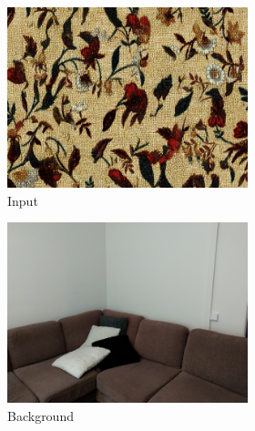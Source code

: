 \begin{figure}[]
    \begin{subfigure}{\textwidth}
        \centering
        \begin{subfigure}{0.24\textwidth}
            \centering
            \includegraphics[width=\textwidth]{images/04-experiment02/sofa/flowers2/target.jpg}
            \caption*{Input}
        \end{subfigure}
        \hfill
        \begin{subfigure}{0.24\textwidth}
            \centering
            \includegraphics[width=\textwidth]{images/04-experiment02/sofa/bg.jpg}
            \caption*{Background}
        \end{subfigure}
        \hfill
        \begin{subfigure}{0.24\textwidth}

\end{subfigure}
\end{subfigure}
\end{figure}
